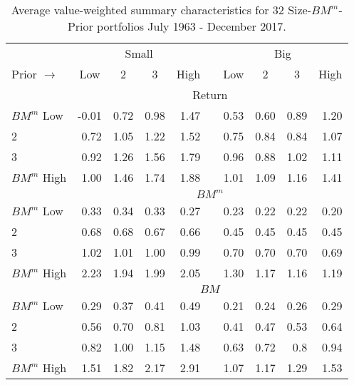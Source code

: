 
\begin{table}[!ht]

\centering
\caption{
\scriptsize{
Average value-weighted summary characteristics for 32 Size-$BM^m$-Prior portfolios
July 1963 - December 2017.
}
}
\begin{tabular}{lrrrrcrrrr}
  \toprule
    & \multicolumn{4}{c}{Small} & & \multicolumn{4}{c}{Big} \\
    \cmidrule(r){2-5} \cmidrule(r){7-10}
  Prior $\rightarrow$     & \multicolumn{1}{c}{Low}  & \multicolumn{1}{c}{2} & \multicolumn{1}{c}{3} & \multicolumn{1}{c}{High} &  & \multicolumn{1}{c}{Low} & \multicolumn{1}{c}{2} & \multicolumn{1}{c}{3} & \multicolumn{1}{c}{High} \\
                          & \multicolumn{9}{c}{Return} \\
  $BM^m$ Low              & -0.01 &  0.72 &  0.98 &  1.47 & &  0.53 &  0.60 &  0.89 &  1.20 \\
  2                       &  0.72 &  1.05 &  1.22 &  1.52 & &  0.75 &  0.84 &  0.84 &  1.07 \\
  3                       &  0.92 &  1.26 &  1.56 &  1.79 & &  0.96 &  0.88 &  1.02 &  1.11 \\
  $BM^m$ High             &  1.00 &  1.46 &  1.74 &  1.88 & &  1.01 &  1.09 &  1.16 &  1.41 \\
[1em]
                          & \multicolumn{9}{c}{$BM^m$} \\
  $BM^m$ Low              &  0.33 &  0.34 &  0.33 &  0.27 & &  0.23 &  0.22 &  0.22 &  0.20 \\
  2                       &  0.68 &  0.68 &  0.67 &  0.66 & &  0.45 &  0.45 &  0.45 &  0.45 \\
  3                       &  1.02 &  1.01 &  1.00 &  0.99 & &  0.70 &  0.70 &  0.70 &  0.69 \\
  $BM^m$ High             &  2.23 &  1.94 &  1.99 &  2.05 & &  1.30 &  1.17 &  1.16 &  1.19 \\
[1em]
                          & \multicolumn{9}{c}{$BM$} \\
  $BM^m$ Low              &  0.29 &  0.37 &  0.41 &  0.49 & &  0.21 &  0.24 &  0.26 &  0.29 \\
  2                       &  0.56 &  0.70 &  0.81 &  1.03 & &  0.41 &  0.47 &  0.53 &  0.64 \\
  3                       &  0.82 &  1.00 &  1.15 &  1.48 & &  0.63 &  0.72 &  0.8  &  0.94 \\
  $BM^m$ High             &  1.51 &  1.82 &  2.17 &  2.91 & &  1.07 &  1.17 &  1.29 &  1.53 \\

\end{tabular}
\end{table}
